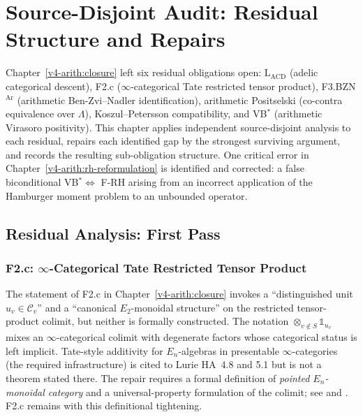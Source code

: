 \chapter{Source-Disjoint Audit: Residual Structure and Repairs}
\label{v4-arith:audit}

Chapter~\ref{v4-arith:closure} left six residual obligations open:
\(\mathrm{L}_{\mathrm{ACD}}\) (adelic categorical descent),
F2.c (\(\infty\)-categorical Tate restricted tensor product),
F3.BZN\(^{\mathrm{Ar}}\) (arithmetic Ben-Zvi--Nadler identification),
arithmetic Positselski (co-contra equivalence over \(\Lambda\)),
Koszul--Petersson compatibility, and
VB\(^{*}\) (arithmetic Virasoro positivity).
This chapter applies independent source-disjoint analysis to each
residual, repairs each identified gap by the strongest surviving
argument, and records the resulting sub-obligation structure.
One critical error in Chapter~\ref{v4-arith:rh-reformulation} is
identified and corrected: a false biconditional
VB\(^{*}\Leftrightarrow\) F-RH arising from an incorrect application
of the Hamburger moment problem to an unbounded operator.

\section{Residual Analysis: First Pass}
\label{v4-arith:sw:ledger}

\subsection{F2.c: \texorpdfstring{\(\infty\)}{infinity}-Categorical Tate Restricted Tensor Product}

The statement of F2.c in Chapter~\ref{v4-arith:closure} invokes a
``distinguished unit \(u_{v}\in\mathcal{C}_{v}\)'' and a ``canonical
\(E_{2}\)-monoidal structure'' on the restricted tensor-product colimit,
but neither is formally constructed. The notation
\(\otimes_{v\notin S}\mathbb{1}_{u_{v}}\) mixes an \(\infty\)-categorical
colimit with degenerate factors whose categorical status is left implicit.
Tate-style additivity for \(E_{n}\)-algebras in presentable
\(\infty\)-categories (the required infrastructure) is cited to Lurie
HA~4.8 and 5.1 but is not a theorem stated there.
The repair requires a formal definition of \emph{pointed
\(E_{n}\)-monoidal category} and a universal-property formulation of the
colimit; see  and
. F2.c remains \ClaimStatusConjectured{}
with this definitional tightening.

